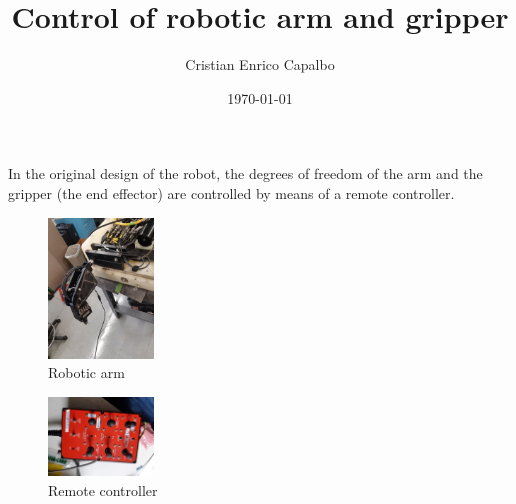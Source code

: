\documentclass[12pt, letterpaper]{article}
\title{Control of robotic arm and gripper}
\author{Cristian Enrico Capalbo}
\date{\today}
\begin{document}
\maketitle

In the original design of the robot, the degrees of freedom of the arm and the gripper (the end effector) are controlled by means of a remote controller. 

\begin{figure}[h]
    \centering
    \includegraphics[width=0.25\textwidth]{arm}
    \caption{Robotic arm}
    \label{fig:arm}
\end{figure}

\begin{figure}[h]
    \centering
    \includegraphics[width=0.25\textwidth]{remote.jpg}
    \caption{Remote controller}
    \label{fig:remote}
\end{figure}
\end{document}

